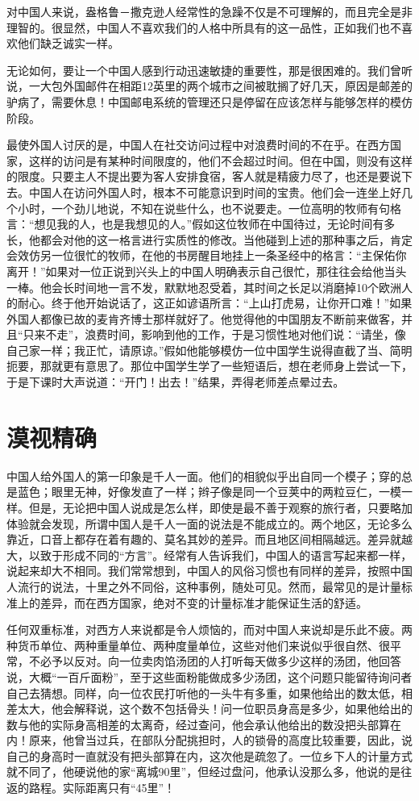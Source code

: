 \documentclass[12pt,oneside]{book}
\begin{document}
\begin{common-format}
对中国人来说，盎格鲁－撒克逊人经常性的急躁不仅是不可理解的，而且完全是非理智的。很显然，中国人不喜欢我们的人格中所具有的这一品性，正如我们也不喜欢他们缺乏诚实一样。 

无论如何，要让一个中国人感到行动迅速敏捷的重要性，那是很困难的。我们曾听说，一大包外国邮件在相距12英里的两个城市之间被耽搁了好几天，原因是邮差的驴病了，需要休息！中国邮电系统的管理还只是停留在应该怎样与能够怎样的模仿阶段。 

最使外国人讨厌的是，中国人在社交访问过程中对浪费时间的不在乎。在西方国家，这样的访问是有某种时间限度的，他们不会超过时间。但在中国，则没有这样的限度。只要主人不提出要为客人安排食宿，客人就是精疲力尽了，也还是要说下去。中国人在访问外国人时，根本不可能意识到时间的宝贵。他们会一连坐上好几个小时，一个劲儿地说，不知在说些什么，也不说要走。一位高明的牧师有句格言：“想见我的人，也是我想见的人。”假如这位牧师在中国待过，无论时间有多长，他都会对他的这一格言进行实质性的修改。当他碰到上述的那种事之后，肯定会效仿另一位很忙的牧师，在他的书房醒目地挂上一条圣经中的格言：“主保佑你离开！”如果对一位正说到兴头上的中国人明确表示自己很忙，那往往会给他当头一棒。他会长时间地一言不发，默默地忍受着，其时间之长足以消磨掉10个欧洲人的耐心。终于他开始说话了，这正如谚语所言：“上山打虎易，让你开口难！”如果外国人都像已故的麦肯齐博士那样就好了。他觉得他的中国朋友不断前来做客，并且“只来不走”，浪费时间，影响到他的工作，于是习惯性地对他们说：“请坐，像自己家一样；我正忙，请原谅。”假如他能够模仿一位中国学生说得直截了当、简明扼要，那就更有意思了。那位中国学生学了一些短语后，想在老师身上尝试一下，于是下课时大声说道：“开门！出去！”结果，弄得老师差点晕过去。



\chapter{漠视精确}
中国人给外国人的第一印象是千人一面。他们的相貌似乎出自同一个模子；穿的总是蓝色；眼里无神，好像发直了一样；辫子像是同一个豆荚中的两粒豆仁，一模一样。但是，无论把中国人说成是怎么样，即使是最不善于观察的旅行者，只要略加体验就会发现，所谓中国人是千人一面的说法是不能成立的。两个地区，无论多么靠近，口音上都存在着有趣的、莫名其妙的差异。而且地区间相隔越远。差异就越大，以致于形成不同的“方言”。经常有人告诉我们，中国人的语言写起来都一样，说起来却大不相同。我们常常想到，中国人的风俗习惯也有同样的差异，按照中国人流行的说法，十里之外不同俗，这种事例，随处可见。然而，最常见的是计量标准上的差异，而在西方国家，绝对不变的计量标准才能保证生活的舒适。 

任何双重标准，对西方人来说都是令人烦恼的，而对中国人来说却是乐此不疲。两种货币单位、两种重量单位、两种度量单位，这些对他们来说似乎很自然、很平常，不必予以反对。向一位卖肉馅汤团的人打听每天做多少这样的汤团，他回答说，大概“一百斤面粉”，至于这些面粉能做成多少汤团，这个问题只能留待询问者自己去猜想。同样，向一位农民打听他的一头牛有多重，如果他给出的数太低，相差太大，他会解释说，这个数不包括骨头！问一位职员身高是多少，如果他给出的数与他的实际身高相差的太离奇，经过查问，他会承认他给出的数没把头部算在内！原来，他曾当过兵，在部队分配挑担时，人的锁骨的高度比较重要，因此，说自己的身高时一直就没有把头部算在内，这次他是疏忽了。一位乡下人的计量方式就不同了，他硬说他的家“离城90里”，但经过盘问，他承认没那么多，他说的是往返的路程。实际距离只有“45里”！ 


\end{common-format}
\end{document}
